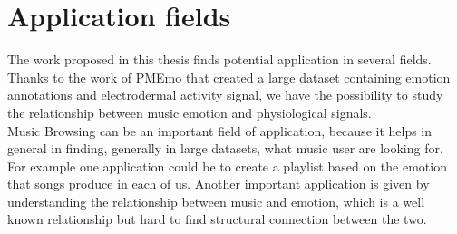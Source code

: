 \section{Application fields}
\indent
The work proposed in this thesis finds potential application in several fields. Thanks to the work of PMEmo that created a large dataset containing emotion annotations and electrodermal activity signal, we have the possibility to study the relationship between music emotion and physiological signals.
\\
Music Browsing can be an important field of application, because it helps in general in finding, generally in large datasets, what music user are looking for. For example one application could be to create a playlist based on the emotion that songs produce in each of us.
Another important application is given by understanding the relationship between music and emotion, which is a well known relationship but hard to find structural connection between the two.





